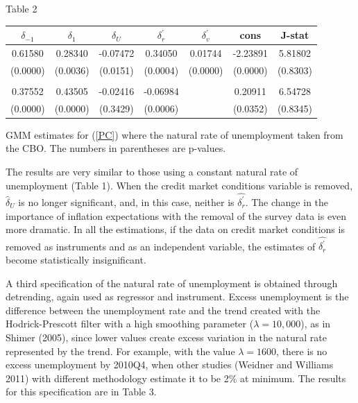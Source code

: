 \documentclass{article}
\begin{document}
\begin{center}
{\Large Table 2}

{\Large \medskip }

\begin{tabular}{||c|c|c|c|c|c|c||}
\hline\hline
$\delta _{-1}$ & $\delta _{1}$ & $\delta _{U}$ & $\delta _{r}^{\prime }$ & $%
\delta _{v}^{\prime }$ & cons & J-stat \\ \hline
0.61580 & 0.28340 & -0.07472 & 0.34050 & 0.01744 & -2.23891 & 5.81802 \\
\hline
(0.0000) & (0.0036) & (0.0151) & (0.0004) & (0.0000) & (0.0000) & (0.8303)
\\ \hline
&  &  &  &  &  & \\ \hline
0.37552 & 0.43505 & -0.02416 & -0.06984 &  & 0.20911 & 6.54728 \\ \hline
(0.0000) & (0.0000) & (0.3429) & (0.0006) &  & (0.0352) & (0.8345) \\
\hline\hline
\end{tabular}%
\medskip

{\small GMM estimates for (\ref{PC}) where the natural rate of unemployment
taken from the CBO. The numbers in parentheses are p-values.}\medskip
\end{center}

The results are very similar to those using a constant natural rate of
unemployment (Table 1). When the credit market conditions variable is
removed, $\widehat{\delta }_{U}$ is no longer significant, and, in this
case, neither is $\widehat{\delta _{r}^{\prime }}.$ The change in the
importance of inflation expectations with the removal of the survey data is
even more dramatic. In all the estimations, if the data on credit market
conditions is removed as instruments and as an independent variable, the
estimates of $\widehat{\delta _{r}^{\prime }}$ become statistically
insignificant.

A third specification of the natural rate of unemployment is obtained
through detrending, again used as regressor and instrument. Excess
unemployment is the difference between the unemployment rate and the trend
created with the Hodrick-Prescott filter with a high smoothing parameter
($\lambda =10,000$), as in Shimer (2005), since lower values create excess
variation in the natural rate represented by the trend. For example, with
the value $\lambda =1600$, there is no excess unemployment by 2010Q4, when
other studies (Weidner and Williams 2011) with different methodology estimate
it to be 2\% at minimum. The results for this specification are in Table 3.
\end{document}
